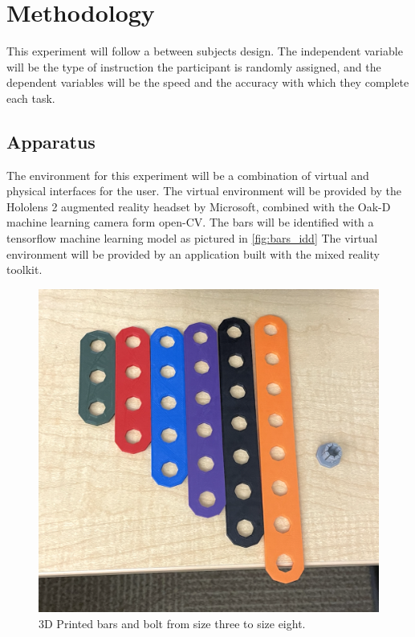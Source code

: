 \documentclass{vgtc}                          %
\begin{document}
\nocite{Ros20}


\section{Methodology}


This experiment will follow a between subjects design. The independent variable will be the type of instruction the participant is randomly assigned, and the dependent variables will be the speed and the accuracy with which they complete each task.


\subsection{Apparatus}





The environment for this experiment will be a combination of virtual and physical interfaces for the user. The virtual environment will be provided by the Hololens 2 augmented reality headset by Microsoft, combined with the Oak-D machine learning camera form open-CV. The bars will be identified with a tensorflow machine learning model as pictured in \autoref{fig:bars_idd} The virtual environment will be provided by an application built with the mixed reality toolkit. 

\begin{figure}[!htbp]
    \centering
    \includegraphics[width=\columnwidth]{bars.png}
    \caption{3D Printed bars and bolt from size three to size eight.}
    \label{fig:bars}
\end{figure}
\end{document}
